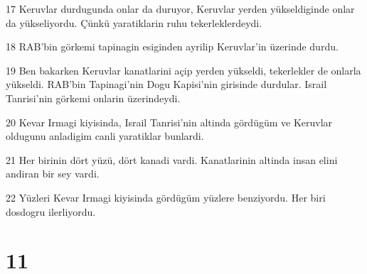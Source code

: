 \par 17 Keruvlar durdugunda onlar da duruyor, Keruvlar yerden yükseldiginde onlar da yükseliyordu. Çünkü yaratiklarin ruhu tekerleklerdeydi.
\par 18 RAB'bin görkemi tapinagin esiginden ayrilip Keruvlar'in üzerinde durdu.
\par 19 Ben bakarken Keruvlar kanatlarini açip yerden yükseldi, tekerlekler de onlarla yükseldi. RAB'bin Tapinagi'nin Dogu Kapisi'nin girisinde durdular. Israil Tanrisi'nin görkemi onlarin üzerindeydi.
\par 20 Kevar Irmagi kiyisinda, Israil Tanrisi'nin altinda gördügüm ve Keruvlar oldugunu anladigim canli yaratiklar bunlardi.
\par 21 Her birinin dört yüzü, dört kanadi vardi. Kanatlarinin altinda insan elini andiran bir sey vardi.
\par 22 Yüzleri Kevar Irmagi kiyisinda gördügüm yüzlere benziyordu. Her biri dosdogru ilerliyordu.

\chapter{11}

